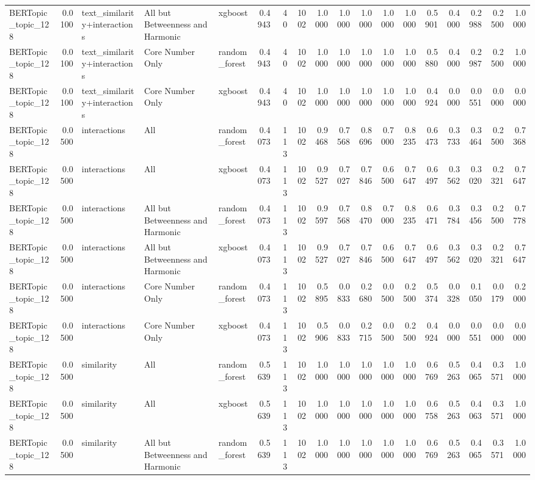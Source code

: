 \begin{tabular}{lrlllrrrrrrrrrrrrr}
BERTopic_topic_128 & 0.0100 & text_similarity+interactions & All but Betweenness and Harmonic & xgboost & 0.4943 & 40 & 1002 & 1.0000 & 1.0000 & 1.0000 & 1.0000 & 1.0000 & 0.5901 & 0.4000 & 0.2988 & 0.2500 & 1.0000 \\
BERTopic_topic_128 & 0.0100 & text_similarity+interactions & Core Number Only & random_forest & 0.4943 & 40 & 1002 & 1.0000 & 1.0000 & 1.0000 & 1.0000 & 1.0000 & 0.5880 & 0.4000 & 0.2987 & 0.2500 & 1.0000 \\
BERTopic_topic_128 & 0.0100 & text_similarity+interactions & Core Number Only & xgboost & 0.4943 & 40 & 1002 & 1.0000 & 1.0000 & 1.0000 & 1.0000 & 1.0000 & 0.4924 & 0.0000 & 0.0551 & 0.0000 & 0.0000 \\
BERTopic_topic_128 & 0.0500 & interactions & All & random_forest & 0.4073 & 113 & 1002 & 0.9468 & 0.7568 & 0.8696 & 0.7000 & 0.8235 & 0.6473 & 0.3733 & 0.3464 & 0.2500 & 0.7368 \\
BERTopic_topic_128 & 0.0500 & interactions & All & xgboost & 0.4073 & 113 & 1002 & 0.9527 & 0.7027 & 0.7846 & 0.6500 & 0.7647 & 0.6497 & 0.3562 & 0.3020 & 0.2321 & 0.7647 \\
BERTopic_topic_128 & 0.0500 & interactions & All but Betweenness and Harmonic & random_forest & 0.4073 & 113 & 1002 & 0.9597 & 0.7568 & 0.8470 & 0.7000 & 0.8235 & 0.6471 & 0.3784 & 0.3456 & 0.2500 & 0.7778 \\
BERTopic_topic_128 & 0.0500 & interactions & All but Betweenness and Harmonic & xgboost & 0.4073 & 113 & 1002 & 0.9527 & 0.7027 & 0.7846 & 0.6500 & 0.7647 & 0.6497 & 0.3562 & 0.3020 & 0.2321 & 0.7647 \\
BERTopic_topic_128 & 0.0500 & interactions & Core Number Only & random_forest & 0.4073 & 113 & 1002 & 0.5895 & 0.0833 & 0.2680 & 0.0500 & 0.2500 & 0.5374 & 0.0328 & 0.1050 & 0.0179 & 0.2000 \\
BERTopic_topic_128 & 0.0500 & interactions & Core Number Only & xgboost & 0.4073 & 113 & 1002 & 0.5906 & 0.0833 & 0.2715 & 0.0500 & 0.2500 & 0.4924 & 0.0000 & 0.0551 & 0.0000 & 0.0000 \\
BERTopic_topic_128 & 0.0500 & similarity & All & random_forest & 0.5639 & 113 & 1002 & 1.0000 & 1.0000 & 1.0000 & 1.0000 & 1.0000 & 0.6769 & 0.5263 & 0.4065 & 0.3571 & 1.0000 \\
BERTopic_topic_128 & 0.0500 & similarity & All & xgboost & 0.5639 & 113 & 1002 & 1.0000 & 1.0000 & 1.0000 & 1.0000 & 1.0000 & 0.6758 & 0.5263 & 0.4063 & 0.3571 & 1.0000 \\
BERTopic_topic_128 & 0.0500 & similarity & All but Betweenness and Harmonic & random_forest & 0.5639 & 113 & 1002 & 1.0000 & 1.0000 & 1.0000 & 1.0000 & 1.0000 & 0.6769 & 0.5263 & 0.4065 & 0.3571 & 1.0000 \\

\end{tabular}
